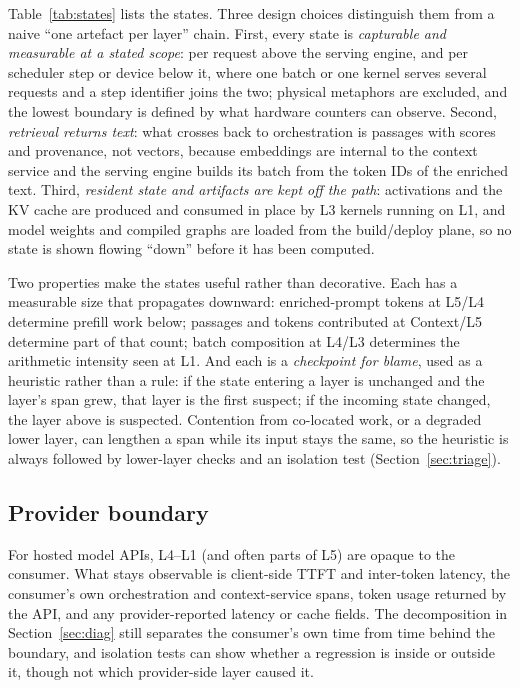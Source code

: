 \documentclass[11pt]{article}
\begin{document}
Table~\ref{tab:states} lists the states. Three design choices distinguish them from a naive ``one artefact per layer'' chain. First, every state is \emph{capturable and measurable at a stated scope}: per request above the serving engine, and per scheduler step or device below it, where one batch or one kernel serves several requests and a step identifier joins the two; physical metaphors are excluded, and the lowest boundary is defined by what hardware counters can observe. Second, \emph{retrieval returns text}: what crosses back to orchestration is passages with scores and provenance, not vectors, because embeddings are internal to the context service and the serving engine builds its batch from the token IDs of the enriched text. Third, \emph{resident state and artifacts are kept off the path}: activations and the KV cache are produced and consumed in place by L3 kernels running on L1, and model weights and compiled graphs are loaded from the build/deploy plane, so no state is shown flowing ``down'' before it has been computed.

Two properties make the states useful rather than decorative. Each has a measurable size that propagates downward: enriched-prompt tokens at L5/L4 determine prefill work below; passages and tokens contributed at Context/L5 determine part of that count; batch composition at L4/L3 determines the arithmetic intensity seen at L1. And each is a \emph{checkpoint for blame}, used as a heuristic rather than a rule: if the state entering a layer is unchanged and the layer's span grew, that layer is the first suspect; if the incoming state changed, the layer above is suspected. Contention from co-located work, or a degraded lower layer, can lengthen a span while its input stays the same, so the heuristic is always followed by lower-layer checks and an isolation test (Section~\ref{sec:triage}).

\subsection{Provider boundary}
\label{sec:provider}
For hosted model APIs, L4--L1 (and often parts of L5) are opaque to the consumer. What stays observable is client-side TTFT and inter-token latency, the consumer's own orchestration and context-service spans, token usage returned by the API, and any provider-reported latency or cache fields. The decomposition in Section~\ref{sec:diag} still separates the consumer's own time from time behind the boundary, and isolation tests can show whether a regression is inside or outside it, though not which provider-side layer caused it.
\end{document}
